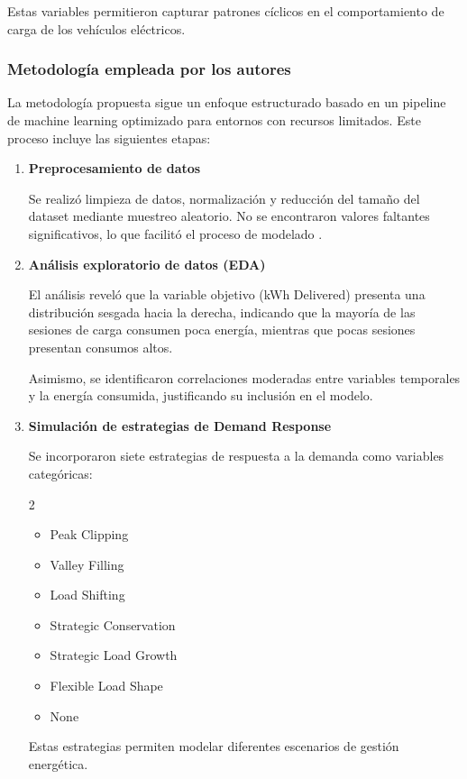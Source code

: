 Estas variables permitieron capturar patrones cíclicos en el comportamiento de carga de los vehículos eléctricos.

\subsubsection{Metodología empleada por los autores}

La metodología propuesta sigue un enfoque estructurado basado en un pipeline de machine learning optimizado para entornos con recursos limitados. Este proceso incluye las siguientes etapas:

\begin{enumerate}
    \item \textbf{Preprocesamiento de datos}

    Se realizó limpieza de datos, normalización y reducción del tamaño del dataset mediante muestreo aleatorio. No se encontraron valores faltantes significativos, lo que facilitó el proceso de modelado \cite{durrani2026}.

    \item \textbf{Análisis exploratorio de datos (EDA)}

    El análisis reveló que la variable objetivo (kWh Delivered) presenta una distribución sesgada hacia la derecha, indicando que la mayoría de las sesiones de carga consumen poca energía, mientras que pocas sesiones presentan consumos altos.

    Asimismo, se identificaron correlaciones moderadas entre variables temporales y la energía consumida, justificando su inclusión en el modelo.

    \item \textbf{Simulación de estrategias de Demand Response}

    Se incorporaron siete estrategias de respuesta a la demanda como variables categóricas:
	\begin{multicols}{2}
    \begin{itemize}
        \item Peak Clipping
        \item Valley Filling
        \item Load Shifting
        \item Strategic Conservation
        \item Strategic Load Growth
        \item Flexible Load Shape
        \item None
    \end{itemize}
	\end{multicols}
    Estas estrategias permiten modelar diferentes escenarios de gestión energética.


\end{enumerate}
